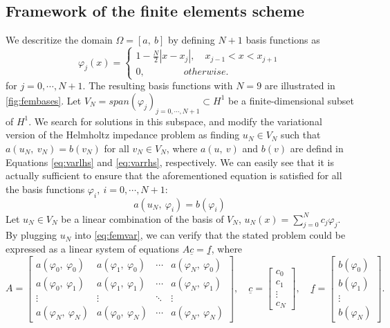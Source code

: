\subsection{Framework of the finite elements scheme}\label{sec:femframework}
We descritize the domain $\Omega=[a,\:b]$ by defining $N+1$ basis functions as
\begin{equation}
    \label{eq:fembasisfuncs}
    \varphi_j(x) = \left\{\begin{matrix}
        1 - \frac{N}{2}|x - x_j|, \quad x_{j-1} < x < x_{j+1}
        \\
        0, \qquad \qquad otherwise.
        \end{matrix}\right.
\end{equation}
for $j = 0, \cdots, N+1$. The resulting basis functions with $N=9$ are illustrated in \autoref{fig:fembases}. Let
$V_N = span(\varphi_j)_{j=0, \cdots, N+1} \subset H^{1}$ be a finite-dimensional subset of $H^{1}$. We search for
solutions in this subspace, and modify the variational version of the Helmholtz impedance problem as finding
$u_N \in V_N$ such that $a(u_N,\:v_N) = b(v_N)$ for all $v_N \in V_N$, where $a(u,\:v)$ and $b(v)$ are defind in Equations
\ref{eq:varlhs} and \ref{eq:varrhs}, respectively. We can easily see that it is actually sufficient to ensure that the aforementioned
equation is satisfied for all the basis functions $\varphi_i,\:i=0, \cdots, N+1$:
\begin{equation}
    \label{eq:femvar}
    a(u_N,\:\varphi_i) = b(\varphi_i)
\end{equation}
Let $u_N \in V_N$ be a linear combination of the basis of $V_N$, $u_N(x) = \sum_{j=0}^{N}{c_j\varphi_j}$. By plugging
$u_N$ into \autoref{eq:femvar}, we can verify that the stated problem could be expressed as a linear system of equations
$A\underline{c}=\underline{f}$, where
\begin{equation}
    \label{eq:femcoeffs}
    A = \begin{bmatrix}
        a(\varphi_0,\:\varphi_0) & a(\varphi_1,\:\varphi_0) & \cdots & a(\varphi_N,\:\varphi_0) \\
        a(\varphi_0,\:\varphi_1) & a(\varphi_1,\:\varphi_1) & \cdots & a(\varphi_N,\:\varphi_1) \\
        \vdots & \vdots & \ddots & \vdots \\
        a(\varphi_N,\:\varphi_N) & a(\varphi_0,\:\varphi_N) & \cdots & a(\varphi_N,\:\varphi_N)
        \end{bmatrix},
        \quad
        \underline{c} = \begin{bmatrix}
        c_0\\
        c_1\\
        \vdots\\
        c_N
        \end{bmatrix},
        \quad
        \underline{f} = \begin{bmatrix}
        b(\varphi_0)\\
        b(\varphi_1)\\
        \vdots\\
        b(\varphi_N)
        \end{bmatrix}.
\end{equation}
